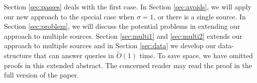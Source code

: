 Section \ref{sec:passes} deals with the first case. In Section \ref{sec:avoids},
we will apply our new approach to the special case when $\sigma =1$,
or there is a single source. In Section \ref{sec:problem}, we will discuss the
potential problems in extending our approach to multiple sources.
Section \ref{sec:multi1} and \ref{sec:multi2}  extends our approach
to multiple sources and in Section \ref{sec:data} we develop our data-structure
that can answer queries in $\tilde O(1)$ time.
\iflong
\else
To save space, we have omitted proofs in this extended abstract. The concerned reader may read
the proof in the full version of the paper.
\fi
